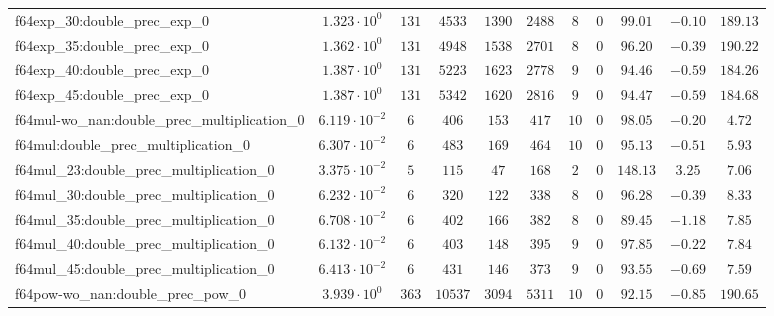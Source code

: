 \begin{tabular}{|l|c|c|c|c|c|c|c|c|c|c|}
f64exp\_30:double\_prec\_exp\_0                & $ 1.323 \cdot 10^{0}  $ & $ 131    $ & $ 4533   $ & $ 1390  $ & $ 2488  $ & $ 8   $ & $ 0 $ & $ 99.01       $ & $ -0.10   $ & $ 189.13  $ \\
f64exp\_35:double\_prec\_exp\_0                & $ 1.362 \cdot 10^{0}  $ & $ 131    $ & $ 4948   $ & $ 1538  $ & $ 2701  $ & $ 8   $ & $ 0 $ & $ 96.20       $ & $ -0.39   $ & $ 190.22  $ \\
f64exp\_40:double\_prec\_exp\_0                & $ 1.387 \cdot 10^{0}  $ & $ 131    $ & $ 5223   $ & $ 1623  $ & $ 2778  $ & $ 9   $ & $ 0 $ & $ 94.46       $ & $ -0.59   $ & $ 184.26  $ \\
f64exp\_45:double\_prec\_exp\_0                & $ 1.387 \cdot 10^{0}  $ & $ 131    $ & $ 5342   $ & $ 1620  $ & $ 2816  $ & $ 9   $ & $ 0 $ & $ 94.47       $ & $ -0.59   $ & $ 184.68  $ \\
f64mul-wo\_nan:double\_prec\_multiplication\_0 & $ 6.119 \cdot 10^{-2} $ & $ 6      $ & $ 406    $ & $ 153   $ & $ 417   $ & $ 10  $ & $ 0 $ & $ 98.05       $ & $ -0.20   $ & $ 4.72    $ \\
f64mul:double\_prec\_multiplication\_0         & $ 6.307 \cdot 10^{-2} $ & $ 6      $ & $ 483    $ & $ 169   $ & $ 464   $ & $ 10  $ & $ 0 $ & $ 95.13       $ & $ -0.51   $ & $ 5.93    $ \\
f64mul\_23:double\_prec\_multiplication\_0     & $ 3.375 \cdot 10^{-2} $ & $ 5      $ & $ 115    $ & $ 47    $ & $ 168   $ & $ 2   $ & $ 0 $ & $ 148.13      $ & $ 3.25    $ & $ 7.06    $ \\
f64mul\_30:double\_prec\_multiplication\_0     & $ 6.232 \cdot 10^{-2} $ & $ 6      $ & $ 320    $ & $ 122   $ & $ 338   $ & $ 8   $ & $ 0 $ & $ 96.28       $ & $ -0.39   $ & $ 8.33    $ \\
f64mul\_35:double\_prec\_multiplication\_0     & $ 6.708 \cdot 10^{-2} $ & $ 6      $ & $ 402    $ & $ 166   $ & $ 382   $ & $ 8   $ & $ 0 $ & $ 89.45       $ & $ -1.18   $ & $ 7.85    $ \\
f64mul\_40:double\_prec\_multiplication\_0     & $ 6.132 \cdot 10^{-2} $ & $ 6      $ & $ 403    $ & $ 148   $ & $ 395   $ & $ 9   $ & $ 0 $ & $ 97.85       $ & $ -0.22   $ & $ 7.84    $ \\
f64mul\_45:double\_prec\_multiplication\_0     & $ 6.413 \cdot 10^{-2} $ & $ 6      $ & $ 431    $ & $ 146   $ & $ 373   $ & $ 9   $ & $ 0 $ & $ 93.55       $ & $ -0.69   $ & $ 7.59    $ \\
f64pow-wo\_nan:double\_prec\_pow\_0            & $ 3.939 \cdot 10^{0}  $ & $ 363    $ & $ 10537  $ & $ 3094  $ & $ 5311  $ & $ 10  $ & $ 0 $ & $ 92.15       $ & $ -0.85   $ & $ 190.65  $ \\

\end{tabular}
